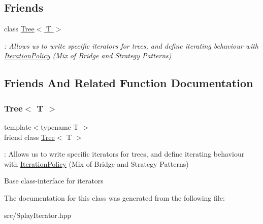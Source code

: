 \subsection*{Friends}
\begin{DoxyCompactItemize}
\item 
class \hyperlink{classSplayIterator_a151ca71f2c751d8a163f3f99ccf6cec9}{Tree$<$ T $>$}
\begin{DoxyCompactList}\small\item\em \+: Allows us to write specific iterators for trees, and define iterating behaviour with \hyperlink{classIterationPolicy}{Iteration\+Policy} (Mix of Bridge and Strategy Patterns) \end{DoxyCompactList}\end{DoxyCompactItemize}


\subsection{Friends And Related Function Documentation}
\mbox{\label{classSplayIterator_a151ca71f2c751d8a163f3f99ccf6cec9}} 
\subsubsection{\texorpdfstring{Tree$<$ T $>$}{Tree< T >}}
{\footnotesize\ttfamily template$<$typename T $>$ \\
friend class \hyperlink{classTree}{Tree}$<$ T $>$\hspace{0.3cm}{\ttfamily [friend]}}



\+: Allows us to write specific iterators for trees, and define iterating behaviour with \hyperlink{classIterationPolicy}{Iteration\+Policy} (Mix of Bridge and Strategy Patterns) 

Base class-\/interface for iterators 

The documentation for this class was generated from the following file\+:\begin{DoxyCompactItemize}
\item 
src/Splay\+Iterator.\+hpp\end{DoxyCompactItemize}
